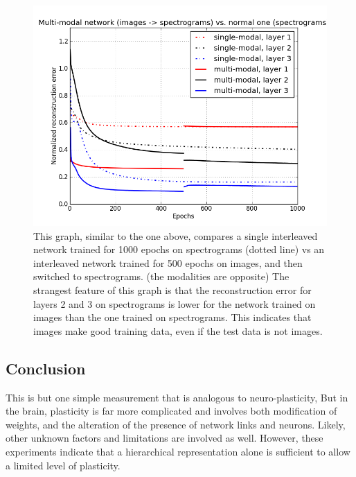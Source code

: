 \documentclass[12pt]{article}
\begin{document}
\begin{doublespacing}
\begin{figure}[p]
\centering
\includegraphics[width=6in]{graph_spect_multi}
\caption{This graph, similar to the one above, compares a single interleaved network trained for 1000 epochs on spectrograms (dotted line) vs an interleaved network trained for 500 epochs on images, and then switched to spectrograms. (the modalities are opposite) The strangest feature of this graph is that the reconstruction error for layers 2 and 3 on spectrograms is lower for the network trained on images than the one trained on spectrograms. This indicates that images make good training data, even if the test data is not images.}
\label{fig:graph_spect_multi}
\end{figure}
	

	
	\subsection{Conclusion}
	This is but one simple measurement that is analogous to neuro-plasticity, But in the brain, plasticity is far more complicated and involves both modification of weights, and the alteration of the presence of network links and neurons. Likely, other unknown factors and limitations are involved as well. However, these experiments indicate that a hierarchical representation alone is sufficient to allow a limited level of plasticity. 

\end{doublespacing}

\nocite{huiskes08}

\singlespacing


\end{document}
